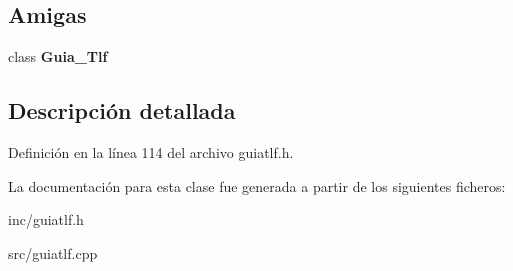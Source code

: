 \subsection*{Amigas}
\begin{DoxyCompactItemize}
\item 
\mbox{\label{classGuia__Tlf_1_1iterator_a4349d7a1b26a0aa94447235f95b2f940}} 
class {\bfseries Guia\+\_\+\+Tlf}
\end{DoxyCompactItemize}


\subsection{Descripción detallada}


Definición en la línea 114 del archivo guiatlf.\+h.



La documentación para esta clase fue generada a partir de los siguientes ficheros\+:\begin{DoxyCompactItemize}
\item 
inc/guiatlf.\+h\item 
src/guiatlf.\+cpp\end{DoxyCompactItemize}
